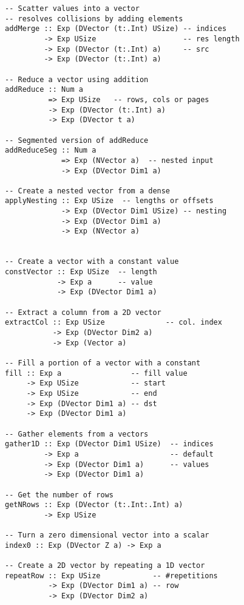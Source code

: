 


\begin{figure}
\begin{small}
\begin{Verbatim}
-- Scatter values into a vector 
-- resolves collisions by adding elements
addMerge :: Exp (DVector (t:.Int) USize) -- indices
         -> Exp USize                    -- res length
         -> Exp (DVector (t:.Int) a)     -- src
         -> Exp (DVector (t:.Int) a) 

-- Reduce a vector using addition
addReduce :: Num a 
          => Exp USize   -- rows, cols or pages
          -> Exp (DVector (t:.Int) a) 
          -> Exp (DVector t a) 

-- Segmented version of addReduce
addReduceSeg :: Num a 
             => Exp (NVector a)  -- nested input
             -> Exp (DVector Dim1 a)

-- Create a nested vector from a dense
applyNesting :: Exp USize  -- lengths or offsets
             -> Exp (DVector Dim1 USize) -- nesting
             -> Exp (DVector Dim1 a)     
             -> Exp (NVector a)


-- Create a vector with a constant value
constVector :: Exp USize  -- length
            -> Exp a      -- value
            -> Exp (DVector Dim1 a) 

-- Extract a column from a 2D vector
extractCol :: Exp USize              -- col. index
           -> Exp (DVector Dim2 a)  
           -> Exp (Vector a) 
 
-- Fill a portion of a vector with a constant 
fill :: Exp a                -- fill value 
     -> Exp USize            -- start 
     -> Exp USize            -- end 
     -> Exp (DVector Dim1 a) -- dst
     -> Exp (DVector Dim1 a) 

-- Gather elements from a vectors 
gather1D :: Exp (DVector Dim1 USize)  -- indices
         -> Exp a                     -- default
         -> Exp (DVector Dim1 a)      -- values
         -> Exp (DVector Dim1 a) 

-- Get the number of rows 
getNRows :: Exp (DVector (t:.Int:.Int) a) 
         -> Exp USize 

-- Turn a zero dimensional vector into a scalar 
index0 :: Exp (DVector Z a) -> Exp a 

-- Create a 2D vector by repeating a 1D vector
repeatRow :: Exp USize            -- #repetitions
          -> Exp (DVector Dim1 a) -- row
          -> Exp (DVector Dim2 a) 


\end{Verbatim}
\end{small}
\end{figure}
